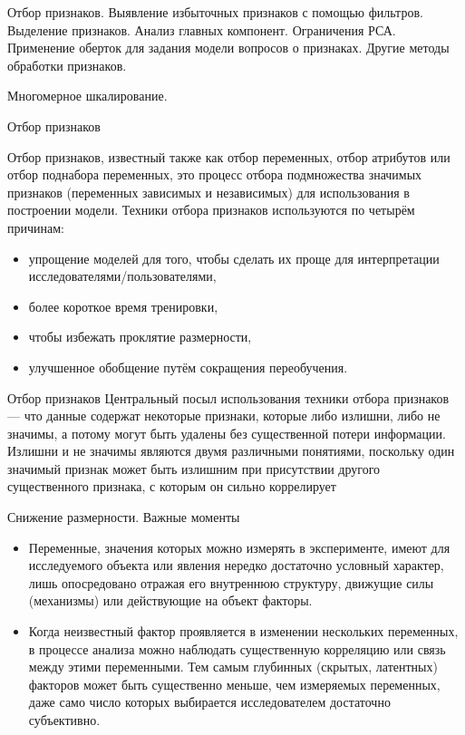\documentclass{beamer}
\begin{document}
\begin{frame}
Отбор признаков. Выявление избыточных признаков с помощью фильтров.  Выделение признаков. 
Анализ главных компонент. Ограничения РСА. 
Применение оберток для задания модели вопросов о признаках. Другие методы обработки признаков.


Многомерное шкалирование.
\end{frame}


\begin{frame}{Отбор признаков}

Отбор признаков, известный также как отбор переменных, отбор атрибутов или отбор поднабора переменных, это процесс отбора подмножества значимых признаков (переменных зависимых и независимых) для использования в построении модели. Техники отбора признаков используются по четырём причинам:
\begin{itemize}


  \item упрощение моделей для того, чтобы сделать их проще для интерпретации исследователями/пользователями,
   \item    более короткое время тренировки,
   \item    чтобы избежать проклятие размерности,
   \item    улучшенное обобщение путём сокращения переобучения.
\end{itemize}
\end{frame}


\begin{frame}{Отбор признаков}
Центральный посыл использования техники отбора признаков — что данные содержат некоторые признаки, которые либо излишни, либо не значимы, а потому могут быть удалены без существенной потери информации. Излишни и не значимы являются двумя различными понятиями, поскольку один значимый признак может быть излишним при присутствии другого существенного признака, с которым он сильно коррелирует


\end{frame}





\begin{frame}{Снижение размерности. Важные моменты}
\begin{itemize}
  \item  Переменные, значения которых можно измерять в эксперименте, имеют для исследуемого объекта или явления нередко достаточно условный характер, лишь опосредовано 
  отражая его внутреннюю структуру, движущие силы (механизмы) или действующие на объект факторы. 
  
  \item Когда неизвестный фактор проявляется в изменении нескольких переменных, в процессе анализа можно наблюдать существенную корреляцию или связь между этими 
  переменными. 
  Тем самым глубинных (скрытых, латентных) факторов может быть существенно меньше, чем измеряемых переменных, даже само число которых выбирается исследователем достаточно 
  субъективно.
\end{itemize} 
 \end{frame}
 
\end{document}
